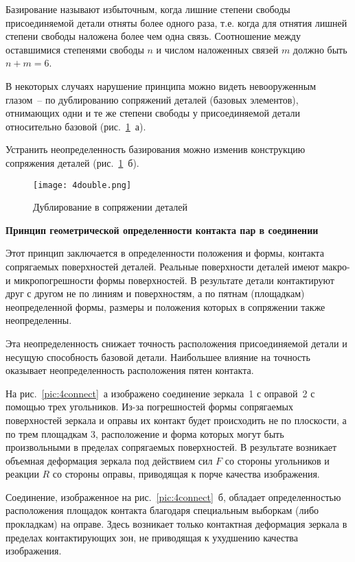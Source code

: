 Базирование называют избыточным, когда лишние степени свободы присоединяемой детали отняты более одного раза, т.е. когда для отнятия лишней степени свободы наложена более чем одна связь. Соотношение между оставшимися степенями свободы $n$ и числом наложенных связей $ m $ должно быть $ n+m = 6 $.

В некоторых случаях нарушение принципа можно видеть невооруженным глазом~-- по дублированию сопряжений деталей (базовых элементов), отнимающих одни и те же степени свободы у присоединяемой детали относительно базовой (рис.~\ref{pic:4double}~а).

Устранить неопределенность базирования можно изменив конструкцию сопряжения деталей (рис.~\ref{pic:4double}~б). 

\begin{figure}[H]
	\caption{Дублирование в сопряжении деталей}
	\texttt{[image: 4double.png]}
	\label{pic:4double}
\end{figure}

\begin{flushleft}
\textbf{Принцип геометрической определенности контакта пар в соединении}
\end{flushleft}

Этот принцип заключается в определенности положения и формы, контакта сопрягаемых поверхностей деталей. Реальные поверхности деталей имеют макро- и микропогрешности формы поверхностей. В результате детали контактируют друг с другом не по линиям и поверхностям, а по пятнам (площадкам) неопределенной формы, размеры и положения которых в сопряжении также неопределенны.

Эта неопределенность снижает точность расположения присоединяемой детали и несущую способность базовой детали. Наибольшее влияние на точность оказывает неопределенность расположения пятен контакта.

На рис.~\ref{pic:4connect}~а изображено соединение зеркала~1 с оправой~2 с помощью трех угольников. Из-за погрешностей формы сопрягаемых поверхностей зеркала и оправы их контакт будет происходить не по плоскости, а по трем площадкам 3, расположение и форма которых могут быть произвольными в пределах сопрягаемых поверхностей. В результате возникает объемная деформация зеркала под действием сил $ F $ со стороны угольников и реакции $ R $ со стороны оправы, приводящая к порче качества изображения.

Соединение, изображенное на рис.~\ref{pic:4connect}~б, обладает определенностью расположения площадок контакта благодаря специальным выборкам (либо прокладкам) на оправе. Здесь возникает только контактная деформация зеркала в пределах контактирующих зон, не приводящая к ухудшению качества изображения.

